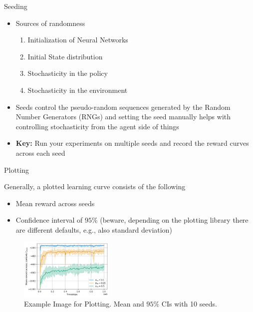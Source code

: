 \documentclass[aspectratio=169]{../latex_main/tntbeamer}  %
\begin{document}
\begin{frame}[c]{Seeding}

    \begin{itemize}
        \item  Sources of randomness
            \begin{enumerate}
                \item Initialization of Neural Networks
                \item Initial State distribution
                \item Stochasticity in the policy
                \item Stochasticity in the environment
            \end{enumerate}
        \vfill
        \item  Seeds control the pseudo-random sequences generated by the Random Number Generators (RNGs) and setting the seed manually helps with controlling stochasticity from the agent side of things
        \vfill
        \item  \textbf{Key:} Run your experiments on multiple seeds and record the reward curves across each seed
    \end{itemize}

   
        
\end{frame}


\begin{frame}[c]{Plotting}

    \small{
    Generally, a plotted learning curve consists of the following
    \begin{itemize}
         \item Mean reward across seeds
        \item Confidence interval of $95\%$ \tiny{(beware, depending on the plotting library there are different defaults, e.g., also standard deviation)}
        
    \end{itemize}
    }

    \hfill
   
    \begin{figure}
        \centering
        \includegraphics[width=0.4\textwidth]{w11_wrap_up/images/Example_Image.png}
        \caption{Example Image for Plotting. Mean and $95\%$ CIs with 10 seeds.}
        \label{fig:my_label}
    \end{figure}

    
\end{frame}
\end{document}
